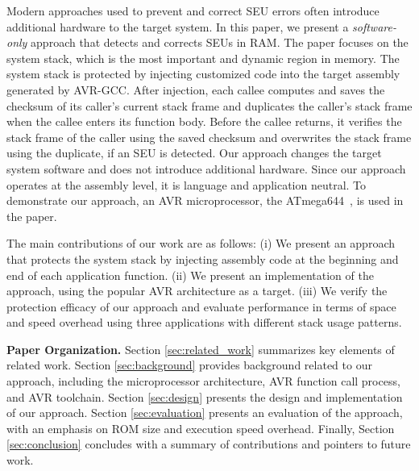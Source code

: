 Modern approaches used to prevent and correct SEU errors often introduce additional hardware to the target system. In this paper, we present a {\em software-only} approach that detects and corrects SEUs in RAM. The paper focuses on the system stack, which is the most important and dynamic region in memory. The system stack is protected by injecting customized code into the target assembly generated by AVR-GCC. After injection, each callee computes and saves the checksum of its caller's current stack frame and duplicates the caller's stack frame when the callee enters its function body. Before the callee returns, it verifies the stack frame of the caller using the saved checksum and overwrites the stack frame using the duplicate, if an SEU is detected. Our approach changes the target system software and does not introduce additional hardware. Since our approach operates at the assembly level, it is language and application neutral. To demonstrate our approach, an AVR microprocessor, the ATmega644~\cite{atmel:avr}, is used in the paper. 

The main contributions of our work are as follows: (i) We present an approach that protects the system stack by injecting assembly code at the beginning and end of each application function. (ii) We present an implementation of the approach, using the popular AVR architecture as a target. (iii) We verify the protection efficacy of our approach and evaluate performance in terms of space and speed overhead using three applications with different stack usage patterns.

{\bf Paper Organization.} Section \ref{sec:related_work} summarizes key elements of related work. Section \ref{sec:background} provides background related to our approach, including the microprocessor architecture, AVR function call process, and AVR toolchain. Section \ref{sec:design} presents the design and implementation of our approach. Section \ref{sec:evaluation} presents an evaluation of the approach, with an emphasis on ROM size and execution speed overhead. Finally, Section \ref{sec:conclusion} concludes with a summary of contributions and pointers to future work.